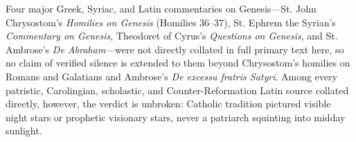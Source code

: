 Four major Greek, Syriac, and Latin commentaries on Genesis---St. John Chrysostom's \emph{Homilies on Genesis} (Homilies 36--37), St. Ephrem the Syrian's \emph{Commentary on Genesis}, Theodoret of Cyrus's \emph{Questions on Genesis}, and St. Ambrose's \emph{De Abraham}---were not directly collated in full primary text here, so no claim of verified silence is extended to them beyond Chrysostom's homilies on Romans and Galatians and Ambrose's \emph{De excessu fratris Satyri}. Among every patristic, Carolingian, scholastic, and Counter-Reformation Latin source collated directly, however, the verdict is unbroken: Catholic tradition pictured visible night stars or prophetic visionary stars, never a patriarch squinting into midday sunlight.
